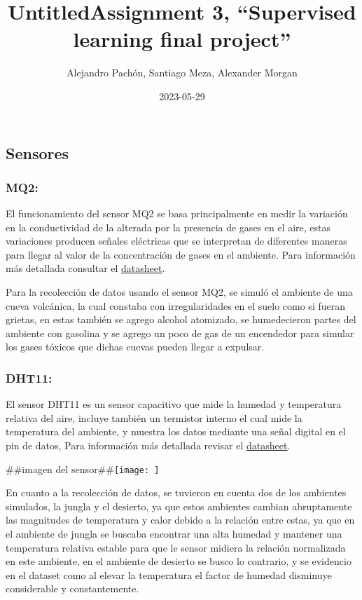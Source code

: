 \documentclass[
]{article}
\title{UntitledAssignment 3, ``Supervised learning final project''}
\author{Alejandro Pachón, Santiago Meza, Alexander Morgan}
\date{2023-05-29}
\begin{document}
\maketitle

\hypertarget{sensores}{%
\subsection{Sensores}\label{sensores}}

\hypertarget{mq2}{%
\subsubsection{MQ2:}\label{mq2}}

El funcionamiento del sensor MQ2 se basa principalmente en medir la
variación en la conductividad de la alterada por la presencia de gases
en el aire, estas variaciones producen señales eléctricas que se
interpretan de diferentes maneras para llegar al valor de la
concentración de gases en el ambiente. Para información más detallada
consultar el
\href{chrome-extension://efaidnbmnnnibpcajpcglclefindmkaj/https://www.pololu.com/file/0J309/MQ2.pdf}{datasheet}.

Para la recolección de datos usando el sensor MQ2, se simuló el ambiente
de una cueva volcánica, la cual constaba con irregularidades en el suelo
como si fueran grietas, en estas también se agrego alcohol atomizado, se
humedecieron partes del ambiente con gasolina y se agrego un poco de gas
de un encendedor para simular los gases tóxicos que dichas cuevas pueden
llegar a expulsar.

\hypertarget{dht11}{%
\subsubsection{DHT11:}\label{dht11}}

El sensor DHT11 es un sensor capacitivo que mide la humedad y
temperatura relativa del aire, incluye también un termistor interno el
cual mide la temperatura del ambiente, y muestra los datos mediante una
señal digital en el pin de datos, Para información más detallada revisar
el
\href{chrome-extension://efaidnbmnnnibpcajpcglclefindmkaj/https://www.mouser.com/datasheet/2/758/DHT11-Technical-Data-Sheet-Translated-Version-1143054.pdf}{datasheet}.

\#\#imagen del sensor\#\#\texttt{[image: ]}

En cuanto a la recolección de datos, se tuvieron en cuenta dos de los
ambientes simulados, la jungla y el desierto, ya que estos ambientes
cambian abruptamente las magnitudes de temperatura y calor debido a la
relación entre estas, ya que en el ambiente de jungla se buscaba
encontrar una alta humedad y mantener una temperatura relativa estable
para que le sensor midiera la relación normalizada en este ambiente, en
el ambiente de desierto se busco lo contrario, y se evidencio en el
dataset como al elevar la temperatura el factor de humedad disminuye
considerable y constantemente.
\end{document}
